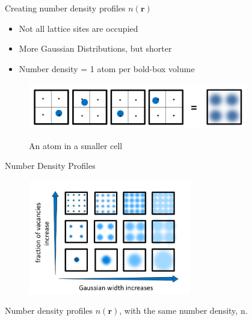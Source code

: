 \documentclass{beamer}
\renewcommand{\vec}[1]{\mathbf{#1}}
\begin{document}
\begin{frame}{Creating number density profiles $n(\vec r)$}
    \begin{itemize}
	    \item Not all lattice sites are occupied
		\item More Gaussian Distributions, but shorter
		\item Number density = 1 atom per bold-box volume
	\end{itemize}	

    \begin{figure}
       \centering
       \includegraphics[height=2cm]{Ensemble_Smallcells.png}
       \label{fig:Ensemble_Smallcells}
       
       An atom in a smaller cell
    \end{figure}     
\end{frame}



\begin{frame}{Number Density Profiles}
    \begin{figure}
       \centering
       \includegraphics[height=5cm]{VaryWidthandVacancies.png}
       \label{fig:Ensemble_vary}
    \end{figure}  
    Number density profiles $n(\vec r)$, with the same number density, n.
\end{frame}
\end{document}

